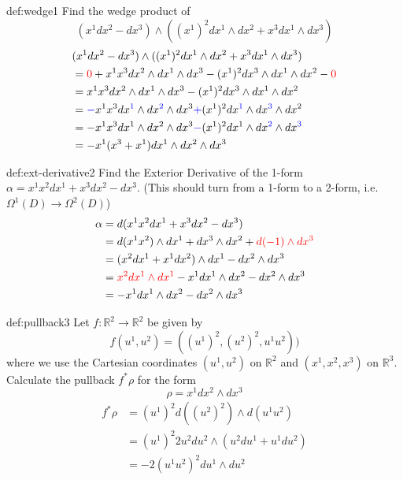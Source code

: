 \documentclass[landscape, 8pt]{extarticle}
\begin{document}
\begin{multicols}{3}
\begin{xmp}{def:wedge}{1}
Find the wedge product of 
\[(x^{1}dx^{2} - dx^{3}) \wedge ((x^{1})^{2}dx^{1}\wedge dx^{2} + x^{3}dx^{1}\wedge dx^{3})\]
\begin{align*}
   &(x^{1}dx^{2} - dx^{3}) \wedge ((x^{1})^{2}dx^{1}\wedge dx^{2} + x^{3}dx^{1}\wedge dx^{3}) \\
    &= \textcolor{red}{0} + x^{1}x^{3}dx^{2}\wedge dx^{1}\wedge dx^{3} - (x^{1})^{2}dx^{3}\wedge dx^{1}\wedge dx^{2} - \textcolor{red}{0} \\
    &= x^{1}x^{3}dx^{2}\wedge dx^{1}\wedge dx^{3} - (x^{1})^{2}dx^{3}\wedge dx^{1}\wedge dx^{2} \\
    &= \textcolor{blue}{-}x^{1}x^{3}dx^{\textcolor{blue}{1}}\wedge dx^{\textcolor{blue}{2}}\wedge dx^{3} \textcolor{blue}{+} (x^{1})^{2}dx^{\textcolor{blue}{1}}\wedge dx^{\textcolor{blue}{3}}\wedge dx^{2} \\
    &= -x^{1}x^{3}dx^{1}\wedge dx^{2}\wedge dx^{3} \textcolor{blue}{-} (x^{1})^{2}dx^{1}\wedge dx^{\textcolor{blue}{2}}\wedge dx^{\textcolor{blue}{3}} \\
    &= -x^{1}(x^{3} + x^{1} )dx^{1}\wedge dx^{2}\wedge dx^{3}
\end{align*}
\end{xmp}


\begin{xmp}{def:ext-derivative}{2}
Find the Exterior Derivative of the 1-form \(\alpha = x^{1}x^{2}dx^{1} + x^{3}dx^{2} - dx^{3}\). (This should turn from a 1-form to a 2-form, i.e. \(\Omega^{1}(D)\to \Omega^{2}(D)\))
\begin{align*}
    \alpha &= d(x^{1}x^{2}dx^{1} + x^{3}dx^{2} - dx^{3}) \\ 
    &= d(x^{1}x^{2})\wedge dx^{1} + dx^{3}\wedge dx^{2} + \textcolor{red}{d(-1)\wedge dx^{3}} \\
    &= (x^{2}dx^{1} + x^{1}dx^{2}) \wedge dx^{1} - dx^{2}\wedge dx^{3} \\
    &= \textcolor{red}{x^{2}dx^{1}\wedge dx^{1}}-x^{1}dx^{1}\wedge dx^{2} - dx^{2} \wedge dx^{3} \\
    &= -x^{1}dx^{1}\wedge dx^{2} - dx^{2} \wedge dx^{3} 
\end{align*}

\end{xmp}

\begin{xmp}{def:pullback}{3}
Let \(f:\mathbb{R}^{2} \to \mathbb{R}^{2}\) be given by
\[f(u^{1}, u^{2}) = ((u^{1})^{2}, (u^{2})^{2}, u^{1}u^{2}))\]
where we use the Cartesian coordinates \((u^{1}, u^{2})\) on \(\mathbb{R}^{2}\) and \((x^{1}, x^{2}, x^{3})\) on \(\mathbb{R}^{3}\). Calculate the pullback \(f^{*}\rho\) for the form
\[\rho = x^{1}dx^{2}\wedge dx^{3}\]
\begin{align*}
    f^*\rho &= (u^{1})^{2}d((u^{2})^{2}) \wedge d(u^{1}u^{2}) \\
    &= (u^{1})^{2} 2u^{2}du^{2} \wedge (u^{2} du^{1} + u^{1}du^{2}) \\
    &= -2(u^{1}u^{2})^{2}du^{1} \wedge du^{2}
\end{align*}


\end{xmp}
\end{multicols}
\end{document}
